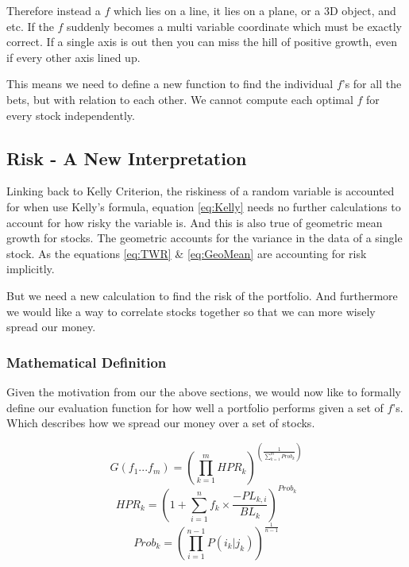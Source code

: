 \documentclass[11pt]{article}
\begin{document}
    Therefore instead a \(f\) which lies on a line, it lies on a plane, or a 3D object, 
    and etc. If the \(f\) suddenly becomes a multi variable coordinate which must be 
    exactly correct. If a single axis is out then you can miss the hill of positive 
    growth, even if every other axis lined up.

    This means we need to define a new function to find the individual \(f\)'s for all the bets,
    but with relation to each other. We cannot compute each optimal \(f\) for every stock
    independently.


\subsection{Risk - A New Interpretation}

    Linking back to Kelly Criterion, the riskiness of a random variable is accounted for
    when use Kelly's formula, equation \ref{eq:Kelly} needs no further calculations
    to account for how risky the variable is. And this is also true of geometric mean growth
    for stocks. The geometric accounts for the variance in the data of a single stock. As the
    equations \ref{eq:TWR} \& \ref{eq:GeoMean} are accounting for risk implicitly.

    But we need a new calculation to find the risk of the portfolio. And furthermore we would
    like a way to correlate stocks together so that we can more wisely spread our money.

\subsubsection{Mathematical Definition}

    Given the motivation from our the above sections, we would now like to formally define our
    evaluation function for how well a portfolio performs given a set of \(f\)'s. Which describes
    how we spread our money over a set of stocks.

    \begin{equation}\label{eq:G}
        G(f_1...f_m) = \left( \displaystyle\prod^{m}_{k=1} HPR_k \right) ^{ \left( \displaystyle\frac{1}{\sum^{m}_{k=1}Prob_k} \right)}
    \end{equation}
    \begin{equation}\label{eq:HPR_k}
        HPR_k = \left( 1 +  \displaystyle\sum^{n}_{i=1} f_k \times \frac{- PL_{k,i}}{BL_k} \right) ^{Prob_k}
    \end{equation}
    \begin{equation}\label{eq:Prob_k}
        Prob_k = \left( \displaystyle\prod^{n - 1}_{i=1} P(i_k | j_k)\right)^{\frac{1}{n - 1}}
    \end{equation}
\end{document}
